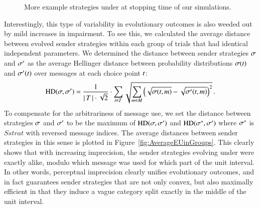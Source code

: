 \begin{figure}
  \caption{More example strategies under \rdd at stopping time of our simulations.}
  \label{fig:MoreExample_strats}
\end{figure}

Interestingly, this type of variability in evolutionary outcomes is
also weeded out by mild increases in impairment. To see this, we
calculated the average distance between evolved sender strategies
within each group of trials that had identical independent
parameters. We determined the distance between sender strategies
$\sigma$ and $\sigma'$ as the average Hellinger distance between
probability distributions $\sigma(t)$ and $\sigma'(t)$
over messages at each choice point $t$:
\begin{align*}
  \text{HD}(\sigma,\sigma') & = \frac{1}{{\left \lvert \, T \, \right\rvert \cdot
     \sqrt{2}}} \cdot  \sum_{t \in T} 
 \sqrt{\sum_{m \in  M}
         \left ( \sqrt{\sigma(t,m)} -
         \sqrt{\sigma'(t,m)} \right )^2 }\,.
      \\
\end{align*}
To compensate for the arbitrariness of message use, we set the
distance between strategies $\sigma$ and $\sigma'$ to be the maximum
of $\text{HD}(\sigma,\sigma')$ and $\text{HD}(\sigma^*,\sigma')$
where $\sigma^*$ is $Sstrat$ with reversed message indices. The
average distances between sender strategies in this sense is plotted
in Figure~\ref{fig:AverageEUinGroups}. This clearly shows that with
increasing imprecision, the sender strategies evolving under \rdd were
exactly alike, modulo which message was used for which part of the
unit interval. In other words, perceptual imprecision clearly unifies
evolutionary outcomes, and in fact guarantees sender strategies that
are not only convex, but also maximally efficient in that they induce
a vague category split exactly in the middle of the unit interval.

